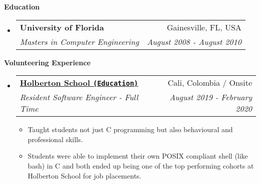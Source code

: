 \documentclass[letterpaper,11pt]{article}
\makeatletter
\newcommand{\resitem}[1]{\item #1 \vspace{-2pt}}
\newcommand{\resheading}[1]{{\large \colorbox{mygrey}{\begin{minipage}{\textwidth}{\textbf{#1 \vphantom{p\^{E}}}}\end{minipage}}}}
\newcommand{\ressubheading}[4]{
\begin{tabular*}{7.0in}{l@{\extracolsep{\fill}}r}
    \textbf{#1} & #2 \\
    \textit{#3} & \textit{#4} \\
\end{tabular*}\vspace{-6pt}}
\makeatother
\begin{document}
\vspace{0.2in}
  
\resheading{Education}
\begin{itemize}
\item
    \ressubheading{University of Florida}{Gainesville, FL, USA}{{Masters in Computer Engineering}}{August 2008 - August 2010}
    \end{itemize}


\vspace{0.2in}

\resheading{Volunteering Experience}
\begin{itemize}

\item
    \ressubheading{\href{https://www.holbertonschool.com/}{Holberton School \texttt{(Education)}}}{Cali, Colombia / Onsite}{Resident Software Engineer - Full Time}{August 2019 - February 2020}
    \begin{itemize}
        \resitem{Taught students not just C programming but also behavioural and professional skills.}
        \resitem{Students were able to implement their own POSIX compliant shell (like bash) in C and both ended up being one of the top performing cohorts at Holberton School for job placements.}
    \end{itemize}

\end{itemize}
\end{document}

